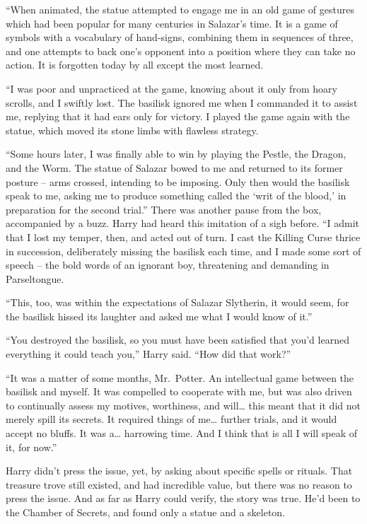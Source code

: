 ``When animated, the statue attempted to engage me in an old game of
gestures which had been popular for many centuries in Salazar's time. It
is a game of symbols with a vocabulary of hand-signs, combining them in
sequences of three, and one attempts to back one's opponent into a
position where they can take no action. It is forgotten today by all
except the most learned.

``I was poor and unpracticed at the game, knowing about it only from
hoary scrolls, and I swiftly lost. The basilisk ignored me when I
commanded it to assist me, replying that it had ears only for victory. I
played the game again with the statue, which moved its stone limbs with
flawless strategy.

``Some hours later, I was finally able to win by playing the Pestle, the
Dragon, and the Worm. The statue of Salazar bowed to me and returned to
its former posture -- arms crossed, intending to be imposing. Only then
would the basilisk speak to me, asking me to produce something called
the `writ of the blood,' in preparation for the second trial.'' There
was another pause from the box, accompanied by a buzz. Harry had heard
this imitation of a sigh before. ``I admit that I lost my temper, then,
and acted out of turn. I cast the Killing Curse thrice in succession,
deliberately missing the basilisk each time, and I made some sort of
speech -- the bold words of an ignorant boy, threatening and demanding
in Parseltongue.

``This, too, was within the expectations of Salazar Slytherin, it would
seem, for the basilisk hissed its laughter and asked me what I would
know of it.''

``You destroyed the basilisk, so you must have been satisfied that you'd
learned everything it could teach you,'' Harry said. ``How did that
work?''

``It was a matter of some months, Mr.~Potter. An intellectual game
between the basilisk and myself. It was compelled to cooperate with me,
but was also driven to continually assess my motives, worthiness, and
will\ldots{} this meant that it did not merely spill its secrets. It
required things of me\ldots{} further trials, and it would accept no
bluffs. It was a\ldots{} harrowing time. And I think that is all I will
speak of it, for now.''

Harry didn't press the issue, yet, by asking about specific spells or
rituals. That treasure trove still existed, and had incredible value,
but there was no reason to press the issue. And as far as Harry could
verify, the story was true. He'd been to the Chamber of Secrets, and
found only a statue and a skeleton.

